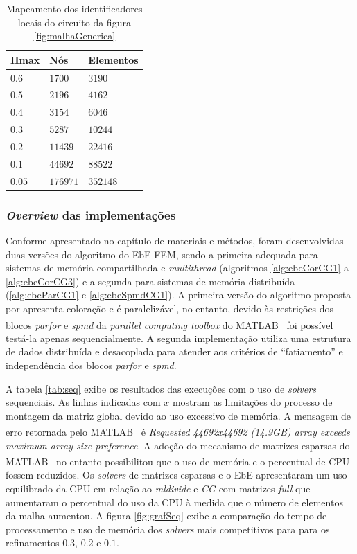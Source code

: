 \documentclass[
    12pt,               %
    openright,          %
    oneside,
    a4paper,            %
    english,            %
    french,             %
    spanish,            %
    brazil              %
    ]{abntex2}
\newcommand{\matlab}{MATLAB\textsuperscript{\textregistered} \ }
\begin{document}
 \begin{table}
	\centering
	\begin{tabular}{|l|l|l|}  
		\hline
		\textbf{Hmax} & \textbf{Nós} & \textbf{Elementos} \\ 
		\hline
		$0.6$ & $1700$ & $3190$ \\
		\hline
		$0.5$ & $2196$ & $4162$ \\
		\hline
		$0.4$ & $3154$ & $6046$ \\
		\hline
		$0.3$ & $5287$ & $10244$ \\
		\hline
		$0.2$ & $11439$ & $22416$ \\       
		\hline
		$0.1$ & $44692$ & $88522$ \\       
		\hline
		$0.05$ & $176971$ & $352148$ \\       
		\hline				
	\end{tabular}
	\caption{Mapeamento dos identificadores locais do circuito da figura \ref{fig:malhaGenerica}}
	\label{tab:hmax}
\end{table}

\subsubsection*{\textit{Overview} das implementações}
Conforme apresentado no capítulo de materiais e métodos, foram desenvolvidas duas versões do algoritmo  do EbE-FEM, sendo a primeira adequada para sistemas de memória compartilhada e \textit{multithread} (algoritmos \ref{alg:ebeCorCG1} a \ref{alg:ebeCorCG3}) e a segunda para sistemas de memória distribuída (\ref{alg:ebeParCG1} e \ref{alg:ebeSpmdCG1}).
A primeira versão do algoritmo proposta por  apresenta coloração e é paralelizável, no entanto, devido às restrições dos blocos \textit{parfor} e \textit{spmd} da \textit{parallel computing toolbox} do \matlab foi possível testá-la apenas  sequencialmente.
A segunda implementação utiliza uma estrutura de dados distribuída e desacoplada para atender aos critérios de ``fatiamento'' e independência dos blocos \textit{parfor} e \textit{spmd}.

A tabela \ref{tab:seq} exibe os resultados das execuções com o uso de \textit{solvers} sequenciais. As linhas indicadas com $x$ mostram as limitações do processo de montagem da matriz global devido ao uso excessivo de memória. A mensagem de erro retornada pelo \matlab é \textit{Requested 44692x44692 (14.9GB) array exceeds maximum array size preference}. A adoção do mecanismo de matrizes esparsas do \matlab no entanto possibilitou que o uso de memória e o percentual de CPU fossem reduzidos. Os \textit{solvers} de matrizes esparsas e o EbE apresentaram um uso equilibrado da CPU em relação ao \textit{mldivide} e \textit{CG} com matrizes \textit{full} que aumentaram o percentual do uso da CPU à medida que o número de elementos da malha aumentou. A figura \ref{fig:grafSeq} exibe a comparação do tempo de processamento e uso de memória dos \textit{solvers} mais competitivos para para os refinamentos $0.3$, $0.2$ e $0.1$.
\end{document}
